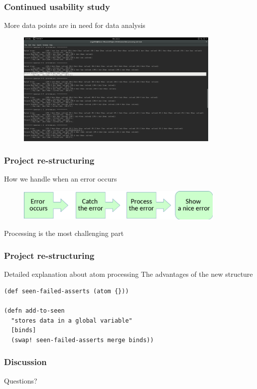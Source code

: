 \documentclass{beamer}
\begin{document}
\begin{frame}
  \frametitle{Continued usability study }
More data points are in need for data analysis
\begin{figure}
\includegraphics[height=55mm]{one-cut.png}
\end{figure}
\end{frame}


\begin{frame}
  \frametitle{Project re-structuring}
How we handle when an error occurs 
\begin{figure}
\includegraphics[height=15mm]{Step.png}
\end{figure}
\alert{Processing} is the most challenging part
\end{frame}


\begin{frame}[fragile]
  \frametitle{Project re-structuring}
Detailed explanation about atom processing
The advantages of the new structure
\begin{verbatim}
(def seen-failed-asserts (atom {}))

(defn add-to-seen
  "stores data in a global variable"
  [binds]
  (swap! seen-failed-asserts merge binds))
\end{verbatim}
\end{frame}

\begin{frame}
  \frametitle{Discussion}
Questions?
\end{frame}
\end{document}
